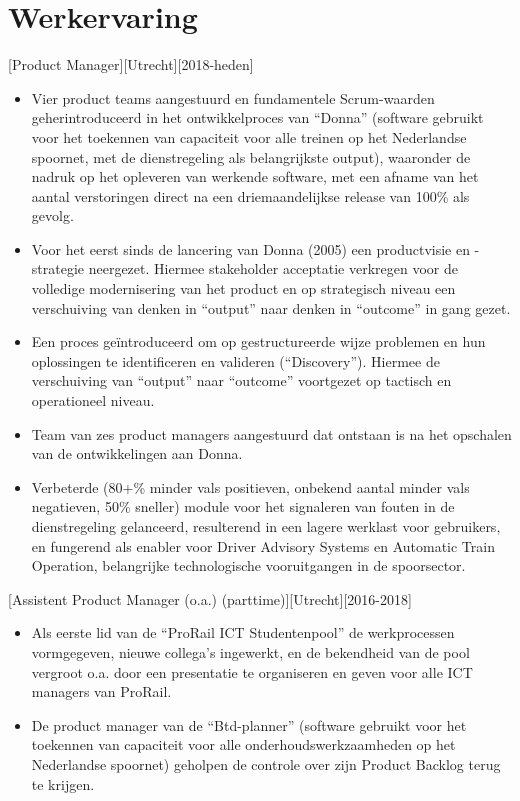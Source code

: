 \documentclass[10pt]{article}
\begin{document}
\makecvtitle

\section{Werkervaring}
\label{sec:work}

[Product Manager][Utrecht][2018-heden]
\begin{itemize}
      \item Vier product teams aangestuurd en fundamentele Scrum-waarden
            geherintroduceerd in het ontwikkelproces van \enquote{Donna} (software gebruikt
            voor het toekennen van capaciteit voor alle treinen op het Nederlandse
            spoornet, met de dienstregeling als belangrijkste output), waaronder de nadruk
            op het opleveren van werkende software, met een afname van het aantal
            verstoringen direct na een driemaandelijkse release van 100\% als gevolg.
      \item Voor het eerst sinds de lancering van Donna (2005) een productvisie en
            -strategie neergezet. Hiermee stakeholder acceptatie verkregen voor de
            volledige modernisering van het product en op strategisch niveau een
            verschuiving van denken in “output” naar denken in “outcome” in gang gezet.
      \item Een proces geïntroduceerd om op gestructureerde wijze problemen en hun
            oplossingen te identificeren en valideren (\enquote{Discovery}). Hiermee de
            verschuiving van “output” naar “outcome” voortgezet op tactisch en operationeel
            niveau.
      \item Team van zes product managers aangestuurd dat ontstaan is na het
            opschalen van de ontwikkelingen aan Donna.
      \item Verbeterde (80+\% minder vals positieven, onbekend aantal minder vals
            negatieven, 50\% sneller) module voor het signaleren van fouten in de
            dienstregeling gelanceerd, resulterend in een lagere werklast voor gebruikers,
            en fungerend als enabler voor Driver Advisory Systems en Automatic Train
            Operation, belangrijke technologische vooruitgangen in de spoorsector.
\end{itemize}

[Assistent Product Manager (o.a.) (parttime)][Utrecht][2016-2018]
\begin{itemize}
      \item Als eerste lid van de \enquote{ProRail ICT Studentenpool} de
            werkprocessen vormgegeven, nieuwe collega's ingewerkt, en de bekendheid van de
            pool vergroot o.a. door een presentatie te organiseren en geven voor alle ICT
            managers van ProRail.
      \item De product manager van de \enquote{Btd-planner} (software gebruikt voor
            het toekennen van capaciteit voor alle onderhoudswerkzaamheden op het
            Nederlandse spoornet) geholpen de controle over zijn Product Backlog terug te
            krijgen.
\end{itemize}
\end{document}
